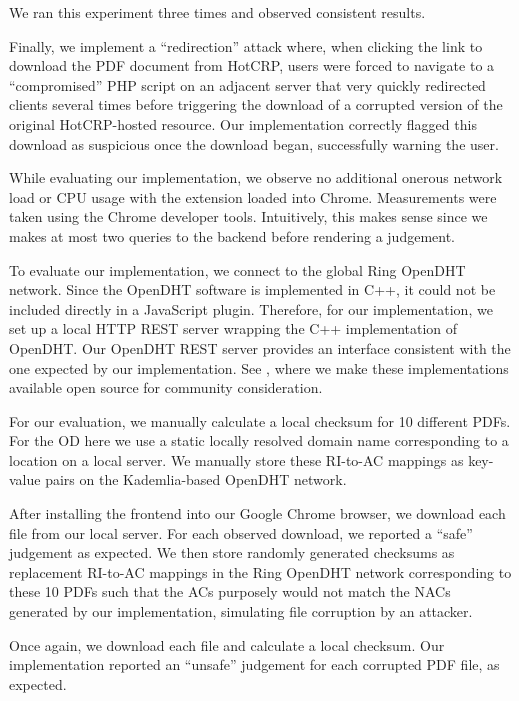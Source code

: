 We ran this experiment three times and observed consistent results.

Finally, we implement a ``redirection'' attack where, when clicking the link to
download the PDF document from HotCRP, users were forced to navigate to a
``compromised'' PHP script on an adjacent server that very quickly redirected
clients several times before triggering the download of a corrupted version of
the original HotCRP-hosted resource. Our implementation correctly flagged this
download as suspicious once the download began, successfully warning the user.

While evaluating our implementation, we observe no additional onerous network
load or CPU usage with the extension loaded into Chrome. Measurements were taken
using the Chrome developer tools. Intuitively, this makes sense since we makes
at most two queries to the backend before rendering a judgement.

To evaluate our implementation, we connect to the global Ring OpenDHT network.
Since the OpenDHT software is implemented in C++, it could not be included
directly in a JavaScript plugin. Therefore, for our implementation, we set up a
local HTTP REST server wrapping the C++ implementation of OpenDHT. Our OpenDHT
REST server provides an interface consistent with the one expected by our
implementation. See , where we make these implementations
available open source for community consideration.

For our evaluation, we manually calculate a local checksum for 10 different
\CONFERENCE{} PDFs. For the OD here we use a static locally resolved domain name
corresponding to a location on a local server. We manually store these RI-to-AC
mappings as key-value pairs on the Kademlia-based OpenDHT network.

After installing the frontend into our Google Chrome browser, we download each
file from our local server. For each observed download, we reported a ``safe''
judgement as expected. We then store randomly generated checksums as replacement
RI-to-AC mappings in the Ring OpenDHT network corresponding to these 10 PDFs
such that the ACs purposely would not match the NACs generated by our
implementation, simulating file corruption by an attacker.

Once again, we download each file and calculate a local checksum. Our
implementation reported an ``unsafe'' judgement for each corrupted PDF file, as
expected.


